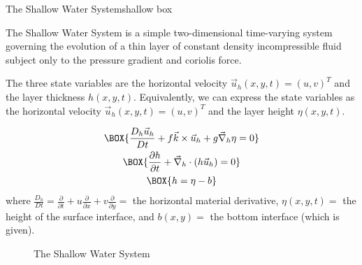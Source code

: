 \begin{fact}{The Shallow Water System}{shallow box}\label{shallow box}

    The Shallow Water System is a simple two-dimensional time-varying system governing the evolution of a thin layer of constant density incompressible fluid subject only to the pressure gradient and coriolis force.

    The three state variables are the horizontal velocity \(\vec{u}_h(x,y,t)=(u,v)^T\) and the layer thickness \(h(x,y,t)\). Equivalently, we can express the state variables as the horizontal velocity \(\vec{u}_h(x,y,t)=(u,v)^T\) and the layer height \(\eta(x,y,t)\).

    \begin{minipage}{.5\linewidth}
    \begin{gather}
        \label{SW mom}
        \BOX{\frac{D_h\vec{u}_h}{Dt}+f\vec{k}\times\vec{u}_h+g\vec{\nabla}_h\eta=0}\\
        \label{SW mass}
        \BOX{\frac{\partial h}{\partial t}+\vec{\nabla}_h\cdot(h\vec{u}_h)=0}\\
        \label{SW height}
        \BOX{h=\eta-b}
    \end{gather}
    where \(\frac{D_h}{Dt}=\frac{\partial}{\partial t}+u\frac{\partial}{\partial x}+v\frac{\partial}{\partial y}=\) the horizontal material derivative, \(\eta(x,y,t)=\) the height of the surface interface, and \(b(x,y)=\) the bottom interface (which is given).
    \end{minipage}
    \hfill
    \begin{minipage}{.48\linewidth}
    \begin{figure}[H]
        \centering
        \caption{The Shallow Water System}
    \end{figure}
    \end{minipage}
\end{fact}

